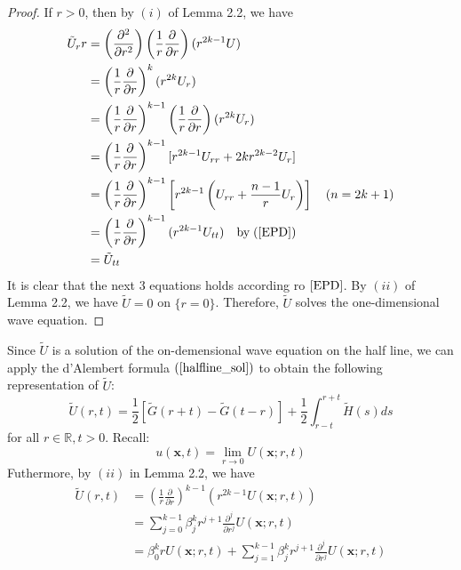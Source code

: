 \documentclass[10pt]{article}
\def\rr{{\mathbb R}}
\def\vc{{\mathbf x}}
\def\wa{{\tilde U}}
\begin{document}
\begin{proof}
    If $r>0$, then by $(i)$ of Lemma 2.2, we have
    \begin{align*}
        \wa_rr &= \left(\frac{\partial^2}{\partial r^2}\right)\left(\frac{1}{r}\frac{\partial}{\partial r}\right)(r^{2k-1}U)\\
        &= \left(\frac{1}{r}\frac{\partial}{\partial r}\right)^k(r^{2k}U_r)\\   
        &= \left(\frac{1}{r}\frac{\partial}{\partial r}\right)^{k-1}\left(\frac{1}{r}\frac{\partial}{\partial r}\right)(r^{2k}U_r)\\
        &= \left(\frac{1}{r}\frac{\partial}{\partial r}\right)^{k-1}[r^{2k-1}U_{rr}+2k r^{2k-2}U_r]\\
        &= \left(\frac{1}{r}\frac{\partial}{\partial r}\right)^{k-1}\left[r^{2k-1}\left(U_{rr}+\frac{n-1}{r}U_r\right)\right] \quad (n=2k+1)\\
        &= \left(\frac{1}{r}\frac{\partial}{\partial r}\right)^{k-1}(r^{2k-1} U_{tt}) \quad \text{by} \;(\ref{EPD})\\
        &= \tilde{U}_{tt}
    \end{align*}
    It is clear that the next $3$ equations holds according ro $\ref{EPD}$. By $(ii)$ of Lemma 2.2, we have $\wa = 0$ on $\{r=0\}$. Therefore, $\tilde{U}$ solves the one-dimensional wave equation.
\end{proof}
Since $\wa$ is a solution of the on-demensional wave equation on the half line, we can apply the d'Alembert formula $(\ref{halfline_sol})$ to obtain the following representation of $\wa$:
\begin{equation}
    \label{wa_representation}
    \wa(r,t) = \frac{1}{2}\left[\tilde{G}(r+t)-\tilde{G}(t-r)\right]+\frac{1}{2}\int_{r-t}^{r+t}\tilde{H}(s)ds
\end{equation}
for all $r\in \rr, t>0$. Recall:
\begin{equation*}
    u(\vc,t) = \lim_{r\rightarrow 0}U(\vc;r,t)
\end{equation*}
Futhermore, by $(ii)$ in Lemma 2.2, we have
\begin{align*}
    \wa(r,t)&=\left(\frac{1}{r}\frac{\partial}{\partial r}\right)^{k-1}(r^{2k-1}U(\vc;r,t))\\
            &=\sum_{j=0}^{k-1} \beta_j^k r^{j+1}\frac{\partial^j}{\partial r^j}U(\vc;r,t)\\
            &=\beta_0^k r U(\vc;r,t)+\sum_{j=1}^{k-1} \beta_j^k r^{j+1}\frac{\partial^j}{\partial r^j}U(\vc;r,t)
\end{align*}
\end{document}
